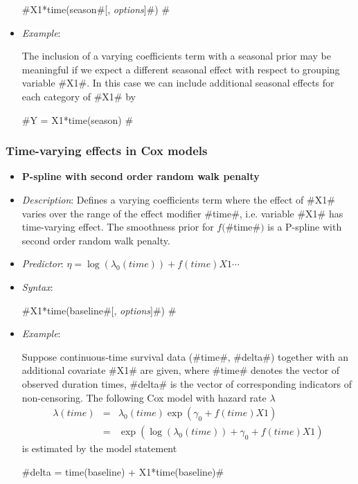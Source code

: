 \begin{itemize}
#X1*time(season#[, {\em options}]#) #
\item[] {\em Example}:

The inclusion of a varying coefficients term with a seasonal prior
may be meaningful if we expect a different seasonal effect with
respect to grouping variable #X1#. In this case we can include
additional seasonal effects for each category of #X1# by

#Y = X1*time(season) #

\end{itemize}

\subsubsection*{Time-varying effects in Cox models}

\begin{itemize}
\item[]{\bf\sffamily P-spline with second order random walk
penalty}

\item[] {\em Description}: Defines a varying coefficients term
where the effect of #X1# varies over the range of the effect
modifier #time#, i.e. variable #X1# has time-varying effect. The
smoothness prior for $f($#time#$)$ is a P-spline with second order
random walk penalty.

 \item[] {\em Predictor}: $\eta = \log(\lambda_0(time)) +
f(time)X1 \cdots$ \item[] {\em Syntax}:

 #X1*time(baseline#[, {\em options}]#) #
 \item[] {\em Example}:

Suppose continuous-time survival data (#time#, #delta#) together
with an additional covariate #X1# are given, where #time# denotes
the vector of observed duration times, #delta# is the vector of
corresponding indicators of non-censoring. The following Cox model
with hazard rate $\lambda$
\begin{eqnarray*}
 \lambda(time) & = & \lambda_0(time)\exp(\gamma_0 + f(time)X1)\\
 & = & \exp\left(\log(\lambda_0(time)) + \gamma_0 + f(time)X1\right)
\end{eqnarray*}
is estimated by the model statement

#delta = time(baseline) + X1*time(baseline)#

\end{itemize}


